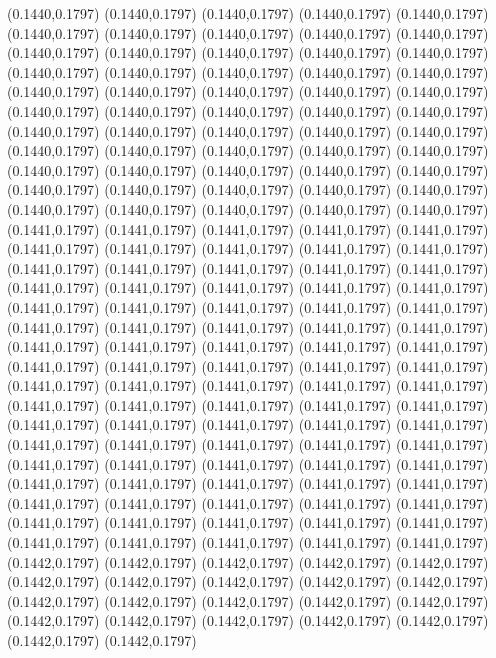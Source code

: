 (0.1440,0.1797)
(0.1440,0.1797)
(0.1440,0.1797)
(0.1440,0.1797)
(0.1440,0.1797)
(0.1440,0.1797)
(0.1440,0.1797)
(0.1440,0.1797)
(0.1440,0.1797)
(0.1440,0.1797)
(0.1440,0.1797)
(0.1440,0.1797)
(0.1440,0.1797)
(0.1440,0.1797)
(0.1440,0.1797)
(0.1440,0.1797)
(0.1440,0.1797)
(0.1440,0.1797)
(0.1440,0.1797)
(0.1440,0.1797)
(0.1440,0.1797)
(0.1440,0.1797)
(0.1440,0.1797)
(0.1440,0.1797)
(0.1440,0.1797)
(0.1440,0.1797)
(0.1440,0.1797)
(0.1440,0.1797)
(0.1440,0.1797)
(0.1440,0.1797)
(0.1440,0.1797)
(0.1440,0.1797)
(0.1440,0.1797)
(0.1440,0.1797)
(0.1440,0.1797)
(0.1440,0.1797)
(0.1440,0.1797)
(0.1440,0.1797)
(0.1440,0.1797)
(0.1440,0.1797)
(0.1440,0.1797)
(0.1440,0.1797)
(0.1440,0.1797)
(0.1440,0.1797)
(0.1440,0.1797)
(0.1440,0.1797)
(0.1440,0.1797)
(0.1440,0.1797)
(0.1440,0.1797)
(0.1440,0.1797)
(0.1440,0.1797)
(0.1440,0.1797)
(0.1440,0.1797)
(0.1440,0.1797)
(0.1440,0.1797)
(0.1441,0.1797)
(0.1441,0.1797)
(0.1441,0.1797)
(0.1441,0.1797)
(0.1441,0.1797)
(0.1441,0.1797)
(0.1441,0.1797)
(0.1441,0.1797)
(0.1441,0.1797)
(0.1441,0.1797)
(0.1441,0.1797)
(0.1441,0.1797)
(0.1441,0.1797)
(0.1441,0.1797)
\PST@Solid(0.1441,0.1797)
(0.1441,0.1797)
(0.1441,0.1797)
(0.1441,0.1797)
(0.1441,0.1797)
(0.1441,0.1797)
(0.1441,0.1797)
(0.1441,0.1797)
(0.1441,0.1797)
(0.1441,0.1797)
(0.1441,0.1797)
(0.1441,0.1797)
(0.1441,0.1797)
(0.1441,0.1797)
(0.1441,0.1797)
(0.1441,0.1797)
(0.1441,0.1797)
(0.1441,0.1797)
(0.1441,0.1797)
(0.1441,0.1797)
(0.1441,0.1797)
(0.1441,0.1797)
(0.1441,0.1797)
(0.1441,0.1797)
(0.1441,0.1797)
(0.1441,0.1797)
(0.1441,0.1797)
(0.1441,0.1797)
(0.1441,0.1797)
(0.1441,0.1797)
(0.1441,0.1797)
(0.1441,0.1797)
(0.1441,0.1797)
(0.1441,0.1797)
(0.1441,0.1797)
(0.1441,0.1797)
(0.1441,0.1797)
(0.1441,0.1797)
(0.1441,0.1797)
(0.1441,0.1797)
(0.1441,0.1797)
(0.1441,0.1797)
(0.1441,0.1797)
(0.1441,0.1797)
(0.1441,0.1797)
(0.1441,0.1797)
(0.1441,0.1797)
(0.1441,0.1797)
(0.1441,0.1797)
(0.1441,0.1797)
(0.1441,0.1797)
(0.1441,0.1797)
(0.1441,0.1797)
(0.1441,0.1797)
(0.1441,0.1797)
(0.1441,0.1797)
(0.1441,0.1797)
(0.1441,0.1797)
(0.1441,0.1797)
(0.1441,0.1797)
(0.1441,0.1797)
(0.1441,0.1797)
(0.1441,0.1797)
(0.1441,0.1797)
(0.1441,0.1797)
(0.1441,0.1797)
(0.1441,0.1797)
(0.1441,0.1797)
(0.1441,0.1797)
(0.1441,0.1797)
(0.1441,0.1797)
(0.1442,0.1797)
(0.1442,0.1797)
(0.1442,0.1797)
(0.1442,0.1797)
(0.1442,0.1797)
(0.1442,0.1797)
(0.1442,0.1797)
(0.1442,0.1797)
(0.1442,0.1797)
(0.1442,0.1797)
(0.1442,0.1797)
(0.1442,0.1797)
(0.1442,0.1797)
(0.1442,0.1797)
(0.1442,0.1797)
(0.1442,0.1797)
(0.1442,0.1797)
(0.1442,0.1797)
(0.1442,0.1797)
(0.1442,0.1797)
(0.1442,0.1797)
(0.1442,0.1797)

